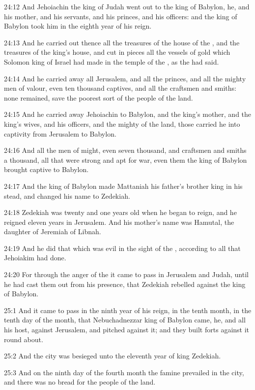24:12 And Jehoiachin the king of Judah went out to the king of
Babylon, he, and his mother, and his servants, and his princes, and
his officers: and the king of Babylon took him in the eighth year of
his reign.

24:13 And he carried out thence all the treasures of the house of the
\LORD, and the treasures of the king's house, and cut in pieces all the
vessels of gold which Solomon king of Israel had made in the temple of
the \LORD, as the \LORD had said.

24:14 And he carried away all Jerusalem, and all the princes, and all
the mighty men of valour, even ten thousand captives, and all the
craftsmen and smiths: none remained, save the poorest sort of the
people of the land.

24:15 And he carried away Jehoiachin to Babylon, and the king's
mother, and the king's wives, and his officers, and the mighty of the
land, those carried he into captivity from Jerusalem to Babylon.

24:16 And all the men of might, even seven thousand, and craftsmen and
smiths a thousand, all that were strong and apt for war, even them the
king of Babylon brought captive to Babylon.

24:17 And the king of Babylon made Mattaniah his father's brother king
in his stead, and changed his name to Zedekiah.

24:18 Zedekiah was twenty and one years old when he began to reign,
and he reigned eleven years in Jerusalem. And his mother's name was
Hamutal, the daughter of Jeremiah of Libnah.

24:19 And he did that which was evil in the sight of the \LORD,
according to all that Jehoiakim had done.

24:20 For through the anger of the \LORD it came to pass in Jerusalem
and Judah, until he had cast them out from his presence, that Zedekiah
rebelled against the king of Babylon.

25:1 And it came to pass in the ninth year of his reign, in the tenth
month, in the tenth day of the month, that Nebuchadnezzar king of
Babylon came, he, and all his host, against Jerusalem, and pitched
against it; and they built forts against it round about.

25:2 And the city was besieged unto the eleventh year of king
Zedekiah.

25:3 And on the ninth day of the fourth month the famine prevailed in
the city, and there was no bread for the people of the land.

